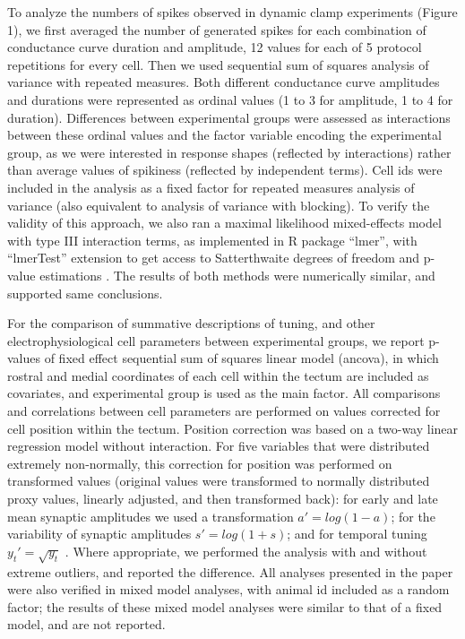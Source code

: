 \documentclass{article}
\begin{document}
To analyze the numbers of spikes observed in dynamic clamp experiments (Figure 1), we first averaged the number of generated spikes for each combination of conductance curve duration and amplitude, 12 values for each of 5 protocol repetitions for every cell. Then we used sequential sum of squares analysis of variance with repeated measures. Both different conductance curve amplitudes and durations were represented as ordinal values (1 to 3 for amplitude, 1 to 4 for duration). Differences between experimental groups were assessed as interactions between these ordinal values and the factor variable encoding the experimental group, as we were interested in response shapes (reflected by interactions) rather than average values of spikiness (reflected by independent terms). Cell ids were included in the analysis as a fixed factor for repeated measures analysis of variance (also equivalent to analysis of variance with blocking). To verify the validity of this approach, we also ran a maximal likelihood mixed-effects model with type III interaction terms, as implemented in R package “lmer”, with “lmerTest” extension to get access to Satterthwaite degrees of freedom and p-value estimations \citep{kuznetsova2017}. The results of both methods were numerically similar, and supported same conclusions.

For the comparison of summative descriptions of tuning, and other electrophysiological cell parameters between experimental groups, we report p-values of fixed effect sequential sum of squares linear model (ancova), in which rostral and medial coordinates of each cell within the tectum are included as covariates, and experimental group is used as the main factor. All comparisons and correlations between cell parameters are performed on values corrected for cell position within the tectum. Position correction was based on a two-way linear regression model without interaction. For five variables that were distributed extremely non-normally, this correction for position was performed on transformed values (original values were transformed to normally distributed proxy values, linearly adjusted, and then transformed back): for early and late mean synaptic amplitudes we used a transformation $a'=log(1-a)$; for the variability of synaptic amplitudes $s'=log(1+s)$; and for temporal tuning $y_t' = \sqrt{y_t}$ . Where appropriate, we performed the analysis with and without extreme outliers, and reported the difference. All analyses presented in the paper were also verified in mixed model analyses, with animal id included as a random factor; the results of these mixed model analyses were similar to that of a fixed model, and are not reported.

\nolinenumbers




\end{document}
